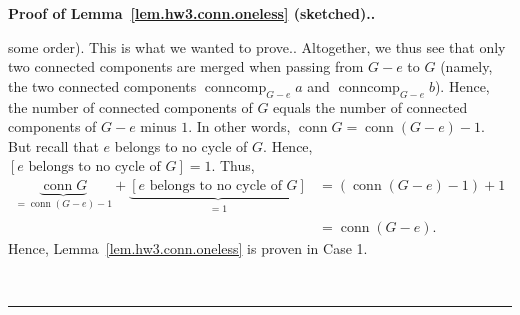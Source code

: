 \documentclass[numbers=enddot,12pt,final,onecolumn,notitlepage]{scrartcl}%
\theoremstyle{definition}
\newenvironment{proof}[1][Proof]{\noindent\textbf{#1.} }{\ \rule{0.5em}{0.5em}}
\newcommand{\conncomp}{\operatorname{conncomp}}
\newcommand{\conn}{\operatorname{conn}}
\newcommand{\tup}[1]{\left( #1 \right)}
\newcommand{\ive}[1]{\left[ #1 \right]}
\newcommand{\underbrack}[2]{\underbrace{#1}_{\substack{#2}}}
\begin{document}
\begin{proof}[Proof of Lemma~\ref{lem.hw3.conn.oneless} (sketched).]
\begin{itemize}
{        some order).
        This is what we wanted to prove.}.
      Altogether, we thus see that only two connected components
      are merged when passing from $G - e$ to $G$ (namely,
      the two connected components
      $\conncomp_{G - e} a$ and $\conncomp_{G - e} b$).
      Hence, the number of connected components of $G$ equals the
      number of connected components of $G - e$ minus $1$.
      In other words,
      $\conn G = \conn \tup{G - e} - 1$.
      But recall that $e$ belongs to no cycle of $G$.
      Hence, $\ive{e \text{ belongs to no cycle of } G} = 1$.
      Thus,
      \begin{align*}
      \underbrace{\conn G}_{= \conn \tup{G - e} - 1}
         + \underbrack{\ive{e \text{ belongs to no cycle of } G}}
                      {= 1}
      &= \tup{\conn \tup{G - e} - 1} + 1 \\
      & = \conn \tup{G - e} .
      \end{align*}
      Hence, Lemma~\ref{lem.hw3.conn.oneless} is proven in Case 1.


\end{itemize}
\end{proof}
\end{document}

